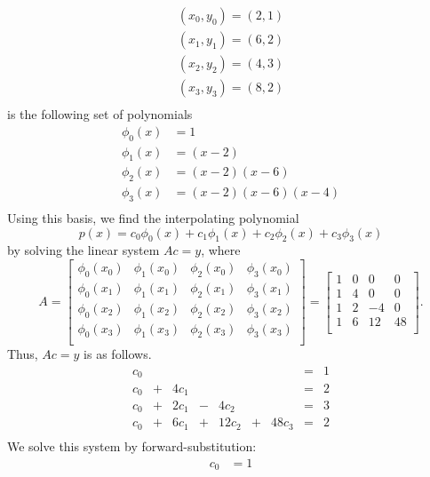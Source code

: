 \documentclass{report}
\begin{document}
\begin{itemize}
\begin{align*}
        (x_0,y_0) = (2,1)\\
        (x_1,y_1) = (6,2)\\
        (x_2, y_2) = (4,3)\\
        (x_3, y_3) = (8,2)\\
    \end{align*}
    is the following set of polynomials
    $$
    \begin{align}
        \phi_0(x) & = 1 \\
        \phi_1(x) & = (x-2) \\
        \phi_2(x) & = (x-2)(x-6) \\
        \phi_3(x) & = (x-2)(x-6)(x-4) \\
    \end{align}
    $$
    Using this basis, we find the interpolating polynomial
    $$p(x) = c_0 \phi_0(x) + c_1 \phi_1(x) + c_2 \phi_2(x) + c_3 \phi_3(x)$$
    by solving the linear system $Ac = y$, where
    $$
    A = 
    \begin{bmatrix}
        \phi_0(x_0) & \phi_1(x_0) & \phi_2(x_0) & \phi_3(x_0)\\
        \phi_0(x_1) & \phi_1(x_1) & \phi_2(x_1) & \phi_3(x_1)\\
        \phi_0(x_2) & \phi_1(x_2) & \phi_2(x_2) & \phi_3(x_2)\\
        \phi_0(x_3) & \phi_1(x_3) & \phi_2(x_3) & \phi_3(x_3)\\
    \end{bmatrix} =
    \begin{bmatrix}
        1 & 0 & 0 & 0 \\
        1 & 4 & 0 & 0 \\
        1 & 2 & -4 & 0 \\
        1 & 6 & 12 & 48 \\
    \end{bmatrix}.
    $$
    Thus, $Ac = y$ is as follows.
    $$
    \begin{matrix}
        c_0 & &       & &       & &       &=& 1 \\
        c_0 &+& 4 c_1 & &       & &       &=& 2 \\
        c_0 &+& 2 c_1 &-& 4c_2  & &       &=& 3 \\
        c_0 &+& 6 c_1 &+& 12c_2 &+& 48c_3 &=& 2 \\
    \end{matrix}
    $$
    We solve this system by forward-substitution:
    $$
    \begin{align}
        c_0 &= 1 
        \\

\end{align}$$
\end{itemize}
\end{document}
